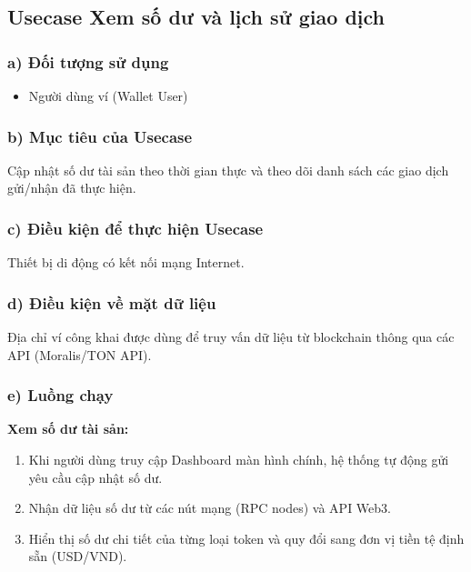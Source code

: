 \documentclass[a4paper]{report}
\begin{document}
\subsection{Usecase Xem số dư và lịch sử giao dịch}

\subsubsection{a) Đối tượng sử dụng}
\begin{itemize}
    \item Người dùng ví (Wallet User)
\end{itemize}

\subsubsection{b) Mục tiêu của Usecase}
Cập nhật số dư tài sản theo thời gian thực và theo dõi danh sách các giao dịch gửi/nhận đã thực hiện.

\subsubsection{c) Điều kiện để thực hiện Usecase}
Thiết bị di động có kết nối mạng Internet.

\subsubsection{d) Điều kiện về mặt dữ liệu}
Địa chỉ ví công khai được dùng để truy vấn dữ liệu từ blockchain thông qua các API (Moralis/TON API).

\subsubsection{e) Luồng chạy}
\textbf{Xem số dư tài sản:}
\begin{enumerate}
    \item Khi người dùng truy cập Dashboard màn hình chính, hệ thống tự động gửi yêu cầu cập nhật số dư.
    \item Nhận dữ liệu số dư từ các nút mạng (RPC nodes) và API Web3.
    \item Hiển thị số dư chi tiết của từng loại token và quy đổi sang đơn vị tiền tệ định sẵn (USD/VND).
\end{enumerate}
\end{document}
